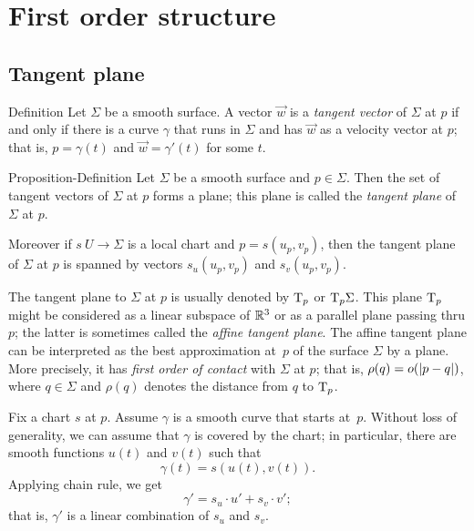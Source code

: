 \chapter{First order structure}
\label{chap:first-order}
\section{Tangent plane}

\begin{thm}{Definition}\label{def:tangent-vector}
Let $\Sigma$ be a smooth surface.
A vector $\vec w$ is a \emph{tangent vector} of $\Sigma$ at $p$ if and only if there is a curve $\gamma$ that runs in $\Sigma$ and has $\vec w$ as a velocity vector at $p$;
that is, $p=\gamma(t)$ and $\vec w=\gamma'(t)$ for some $t$.
\end{thm}

\begin{thm}{Proposition-Definition}\label{def:tangent-plane}
Let $\Sigma$ be a smooth surface and $p\in \Sigma$.
Then the set of tangent vectors of $\Sigma$ at $p$ forms a plane;
this plane is called the \emph{tangent plane} of $\Sigma$ at $p$.

Moreover if $s\:U\to \Sigma$ is a local chart and $p=s(u_p,v_p)$, then 
the tangent plane of $\Sigma$ at $p$ is spanned by vectors $s_u(u_p,v_p)$ and $s_v(u_p,v_p)$.
\end{thm}

The tangent plane to $\Sigma$ at $p$ is usually denoted by $\mathrm{T}_p$ or $\mathrm{T}_p\Sigma$.
This plane $\mathrm{T}_p$ might be considered as a linear subspace of $\mathbb{R}^3$ or as a parallel plane passing thru $p$;
the latter is sometimes called the \emph{affine tangent plane}.
The affine tangent plane can be interpreted as the best approximation at~$p$ of the surface $\Sigma$ by a plane.
More precisely, 
it has \emph{first order of contact} with $\Sigma$ at $p$;
that is, $\rho(q)\z=o(|p-q|)$, where $q\in \Sigma$ and $\rho(q)$ denotes the distance from $q$ to $\mathrm{T}_p$.

Fix a chart $s$ at $p$.
Assume $\gamma$ is a smooth curve that starts at~$p$.
Without loss of generality, we can assume that $\gamma$ is covered by the chart;
in particular, there are smooth functions $u(t)$ and $v(t)$ such that 
\[\gamma(t)=s(u(t),v(t)).\]
Applying chain rule, we get
\[\gamma'=s_u\cdot u'+ s_v\cdot v';\]
that is, $\gamma'$ is a linear combination of $s_u$ and $s_v$.


